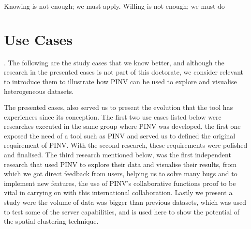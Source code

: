 \begin{savequote}[75mm] 
Knowing is not enough; we must apply. Willing is not enough; we must do
\end{savequote}

\chapter{Use Cases} \label{section:use_cases}

. The following are the study cases that we know better, and although the research in the presented cases is not part of this doctorate, we consider relevant to introduce them to illustrate how PINV can be used to explore and visualise heterogeneous datasets. 

The presented cases, also served us to present the evolution that the tool has experiences since its conception. The first two use cases listed below were researches executed in the same group where PINV was developed, the first one exposed the need of a tool such as PINV and served us to defined the original requirement of PINV. With the second research, these requirements were polished and finalised.  The third research mentioned below, was the first independent research that used PINV to explore their data and visualise their results, from which we got direct feedback from users, helping us to solve many bugs and to implement new features, the use of PINV's collaborative functions proof to be vital in carrying on with this international collaboration. Lastly we present a study were the volume of data was bigger than previous datasets, which was used to test some of the server capabilities, and is used here to show the potential of the spatial clustering technique.

